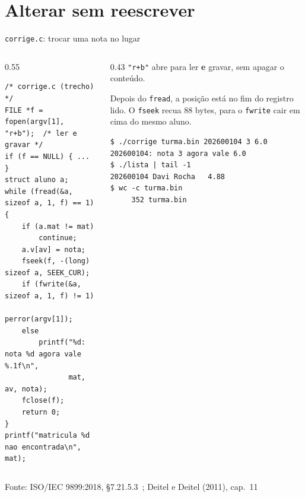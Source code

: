 \documentclass[aspectratio=169]{beamer}
\newcommand{\fonte}[1]{\vfill\hfill{\scriptsize\textcolor{UFSGray}{Fonte: #1}}}
\begin{document}
\section{Alterar sem reescrever}

\begin{frame}[fragile]{\texttt{corrige.c}: trocar uma nota no lugar}
  \vspace{-0.6em}
  \begin{columns}[T]
    \begin{column}{0.55\textwidth}
\begin{lstlisting}[style=codCs]
/* corrige.c (trecho) */
FILE *f = fopen(argv[1], "r+b");  /* ler e gravar */
if (f == NULL) { ... }
struct aluno a;
while (fread(&a, sizeof a, 1, f) == 1) {
    if (a.mat != mat)
        continue;
    a.v[av] = nota;
    fseek(f, -(long) sizeof a, SEEK_CUR);
    if (fwrite(&a, sizeof a, 1, f) != 1)
        perror(argv[1]);
    else
        printf("%d: nota %d agora vale %.1f\n",
               mat, av, nota);
    fclose(f);
    return 0;
}
printf("matricula %d nao encontrada\n", mat);
\end{lstlisting}
    \end{column}
    \begin{column}{0.43\textwidth}
      \small \texttt{"r+b"} abre para ler \textbf{e} gravar, sem apagar o
      conteúdo.

      \medskip
      Depois do \texttt{fread}, a posição está no fim do registro lido. O
      \texttt{fseek} recua 88 bytes, para o \texttt{fwrite} cair em cima do
      mesmo aluno.
\begin{lstlisting}[style=shellS]
$ ./corrige turma.bin 202600104 3 6.0
202600104: nota 3 agora vale 6.0
$ ./lista | tail -1
202600104 Davi Rocha   4.88
$ wc -c turma.bin
     352 turma.bin
\end{lstlisting}
    \end{column}
  \end{columns}
  \fonte{ISO/IEC 9899:2018, §7.21.5.3~\cite{iso2018c17};
    Deitel e Deitel (2011), cap.~11~\cite{deitel2011como}}
\end{frame}
\end{document}
